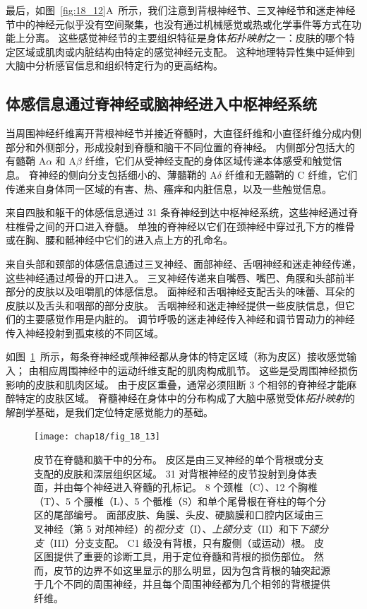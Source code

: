 最后，如图~\ref{fig:18_12}A~所示，我们注意到背根神经节、三叉神经节和迷走神经节中的神经元似乎没有空间聚集，也没有通过机械感觉或热或化学事件等方式在功能上分离。
这些感觉神经节的主要组织特征是身体\textit{拓扑映射}之一：皮肤的哪个特定区域或肌肉或内脏结构由特定的感觉神经元支配。
这种地理特异性集中延伸到大脑中分析感官信息和组织特定行为的更高结构。



\subsection{体感信息通过脊神经或脑神经进入中枢神经系统}

当周围神经纤维离开背根神经节并接近脊髓时，大直径纤维和小直径纤维分成内侧部分和外侧部分，形成投射到脊髓和脑干不同位置的脊神经。
内侧部分包括大的有髓鞘 A$\alpha$ 和 A$\beta$ 纤维，它们从受神经支配的身体区域传递本体感受和触觉信息。
脊神经的侧向分支包括细小的、薄髓鞘的 A$\delta$ 纤维和无髓鞘的 C 纤维，它们传递来自身体同一区域的有害、热、瘙痒和内脏信息，以及一些触觉信息。


来自四肢和躯干的体感信息通过 31 条脊神经到达中枢神经系统，这些神经通过脊柱椎骨之间的开口进入脊髓。 
单独的脊神经以它们在颈神经中穿过孔下方的椎骨或在胸、腰和骶神经中它们的进入点上方的孔命名。


来自头部和颈部的体感信息通过三叉神经、面部神经、舌咽神经和迷走神经传递，这些神经通过颅骨的开口进入。 
三叉神经传递来自嘴唇、嘴巴、角膜和头部前半部分的皮肤以及咀嚼肌的体感信息。
面神经和舌咽神经支配舌头的味蕾、耳朵的皮肤以及舌头和咽部的部分皮肤。
舌咽神经和迷走神经提供一些皮肤信息，但它们的主要感觉作用是内脏的。
调节呼吸的迷走神经传入神经和调节胃动力的神经传入神经投射到孤束核的不同区域。


如图~\ref{fig:18_13}~所示，每条脊神经或颅神经都从身体的特定区域（称为皮区）接收感觉输入；
由相应周围神经中的运动纤维支配的肌肉构成肌节。
这些是受周围神经损伤影响的皮肤和肌肉区域。
由于皮区重叠，通常必须阻断 3 个相邻的脊神经才能麻醉特定的皮肤区域。
脊髓神经在身体中的分布构成了大脑中感觉受体\textit{拓扑映射}的解剖学基础，是我们定位特定感觉能力的基础。


\begin{figure}[htbp]
	\centering
	\texttt{[image: chap18/fig\_18\_13]}
	\caption{皮节在脊髓和脑干中的分布。 
		皮区是由三叉神经的单个背根或分支支配的皮肤和深层组织区域。 
		31 对背根神经的皮节投射到身体表面，并由每个神经进入脊髓的孔标记。 
		8 个颈椎（C）、12 个胸椎（T）、5 个腰椎（L）、5 个骶椎（S）和单个尾骨根在脊柱的每个分区的尾部编号。 
		面部皮肤、角膜、头皮、硬脑膜和口腔内区域由三叉神经（第 5 对颅神经）的\textit{视分支}（I）、\textit{上颌分支}（II）和下\textit{下颌分支}（III）分支支配。
		C1 级没有背根，只有腹侧（或运动）根。 
		皮区图提供了重要的诊断工具，用于定位脊髓和背根的损伤部位。 
		然而，皮节的边界不如这里显示的那么明显，因为包含背根的轴突起源于几个不同的周围神经，并且每个周围神经都为几个相邻的背根提供纤维。}
	\label{fig:18_13}
\end{figure}


